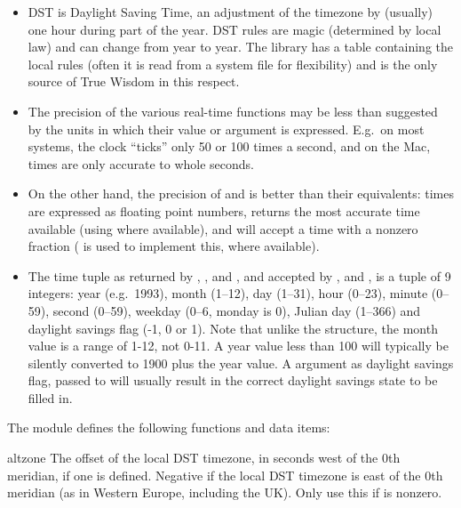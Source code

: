 \begin{itemize}
\item
DST is Daylight Saving Time, an adjustment of the timezone by
(usually) one hour during part of the year.  DST rules are magic
(determined by local law) and can change from year to year.  The \C{}
library has a table containing the local rules (often it is read from
a system file for flexibility) and is the only source of True Wisdom
in this respect.%

\item
The precision of the various real-time functions may be less than
suggested by the units in which their value or argument is expressed.
E.g.\ on most \UNIX{} systems, the clock ``ticks'' only 50 or 100 times a
second, and on the Mac, times are only accurate to whole seconds.

\item
On the other hand, the precision of  and
 is better than their \UNIX{} equivalents: times are
expressed as floating point numbers,  returns the
most accurate time available (using \UNIX{} 
where available), and  will accept a time with a
nonzero fraction (\UNIX{}  is used to implement
this, where available).

\item
The time tuple as returned by ,
, and , and accepted by
,  and , is a
tuple of 9 integers: year (e.g.\ 1993), month (1--12), day (1--31),
hour (0--23), minute (0--59), second (0--59), weekday (0--6, monday is
0), Julian day (1--366) and daylight savings flag (-1, 0  or 1).
Note that unlike the \C{} structure, the month value is a range of 1-12, not
0-11.  A year value less than 100 will typically be silently converted to
1900 plus the year value.  A  argument as daylight savings
flag, passed to  will usually result in the correct
daylight savings state to be filled in.

\end{itemize}

The module defines the following functions and data items:


\begin{datadesc}{altzone}
The offset of the local DST timezone, in seconds west of the 0th
meridian, if one is defined.  Negative if the local DST timezone is
east of the 0th meridian (as in Western Europe, including the UK).
Only use this if  is nonzero.
\end{datadesc}

